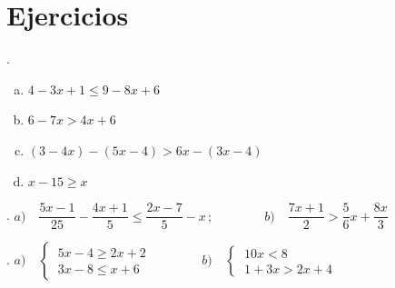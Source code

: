 \vspace{1cm}
\section{Ejercicios}
\vspace{0.5cm}


\begin{mipropuesto}
. \begin{multicols}{2}
 \begin{enumerate}[a)  ]	
 \item 	$4-3x+1\leqslant9-8x+6$
 \item $6-7x>4x+6$
 \item $(3-4x)-(5x-4)>6x-(3x-4)$
 \item $x-15\geqslant x$
 \end{enumerate}
 \end{multicols}

\end{mipropuesto}
\vspace{-8mm}
\begin{flushright}
	\begin{footnotesize} \textcolor{gris}{\rotatebox{180}{ $a)\ \ ]-\infty,2];\quad b)\ \ ]-\infty,0[;\quad c)\ \ ]-\infty,1/4[;\quad d)\ \ \nexists $ solución}}	\end{footnotesize}
\end{flushright}

\begin{mipropuesto}
. $a)\quad \dfrac{5x-1}{25}-\dfrac{4x+1}{5} \leqslant \dfrac{2x-7}{5}-x\, ; \qquad \qquad b) \quad \dfrac{7x+1}{2} > \dfrac{5}{6}x+\dfrac{8x}{3}$
\end{mipropuesto}
\vspace{-8mm}
\begin{flushright}
	\begin{footnotesize} \textcolor{gris}{}	\end{footnotesize}
\end{flushright}

\begin{mipropuesto}
. $ a)\quad \begin{cases} \ 5x-4\geqslant 2x+2 \\ \ 3x-8 \leqslant x+6 \end{cases} \qquad \qquad  
b)\quad \begin{cases} \ 10x<8  \\ \ 1+3x>2x+4 \end{cases} $
\end{mipropuesto}
\vspace{-8mm}
\begin{flushright}
	\begin{footnotesize} \textcolor{gris}{}	\end{footnotesize}
\end{flushright}

